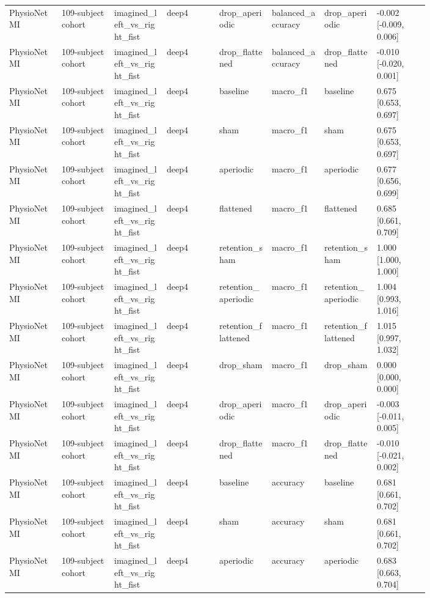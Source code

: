 \begin{longtable}{p{0.10\linewidth}p{0.10\linewidth}p{0.10\linewidth}p{0.10\linewidth}p{0.10\linewidth}p{0.10\linewidth}p{0.10\linewidth}p{0.10\linewidth}}
PhysioNet MI & 109-subject cohort & imagined\_left\_vs\_right\_fist & deep4 & drop\_aperiodic & balanced\_accuracy & drop\_aperiodic & -0.002 [-0.009, 0.006]\\
PhysioNet MI & 109-subject cohort & imagined\_left\_vs\_right\_fist & deep4 & drop\_flattened & balanced\_accuracy & drop\_flattened & -0.010 [-0.020, 0.001]\\
PhysioNet MI & 109-subject cohort & imagined\_left\_vs\_right\_fist & deep4 & baseline & macro\_f1 & baseline & 0.675 [0.653, 0.697]\\
PhysioNet MI & 109-subject cohort & imagined\_left\_vs\_right\_fist & deep4 & sham & macro\_f1 & sham & 0.675 [0.653, 0.697]\\
PhysioNet MI & 109-subject cohort & imagined\_left\_vs\_right\_fist & deep4 & aperiodic & macro\_f1 & aperiodic & 0.677 [0.656, 0.699]\\
PhysioNet MI & 109-subject cohort & imagined\_left\_vs\_right\_fist & deep4 & flattened & macro\_f1 & flattened & 0.685 [0.661, 0.709]\\
PhysioNet MI & 109-subject cohort & imagined\_left\_vs\_right\_fist & deep4 & retention\_sham & macro\_f1 & retention\_sham & 1.000 [1.000, 1.000]\\
PhysioNet MI & 109-subject cohort & imagined\_left\_vs\_right\_fist & deep4 & retention\_aperiodic & macro\_f1 & retention\_aperiodic & 1.004 [0.993, 1.016]\\
PhysioNet MI & 109-subject cohort & imagined\_left\_vs\_right\_fist & deep4 & retention\_flattened & macro\_f1 & retention\_flattened & 1.015 [0.997, 1.032]\\
PhysioNet MI & 109-subject cohort & imagined\_left\_vs\_right\_fist & deep4 & drop\_sham & macro\_f1 & drop\_sham & 0.000 [0.000, 0.000]\\
PhysioNet MI & 109-subject cohort & imagined\_left\_vs\_right\_fist & deep4 & drop\_aperiodic & macro\_f1 & drop\_aperiodic & -0.003 [-0.011, 0.005]\\
PhysioNet MI & 109-subject cohort & imagined\_left\_vs\_right\_fist & deep4 & drop\_flattened & macro\_f1 & drop\_flattened & -0.010 [-0.021, 0.002]\\
PhysioNet MI & 109-subject cohort & imagined\_left\_vs\_right\_fist & deep4 & baseline & accuracy & baseline & 0.681 [0.661, 0.702]\\
PhysioNet MI & 109-subject cohort & imagined\_left\_vs\_right\_fist & deep4 & sham & accuracy & sham & 0.681 [0.661, 0.702]\\
PhysioNet MI & 109-subject cohort & imagined\_left\_vs\_right\_fist & deep4 & aperiodic & accuracy & aperiodic & 0.683 [0.663, 0.704]\\

\end{longtable}
